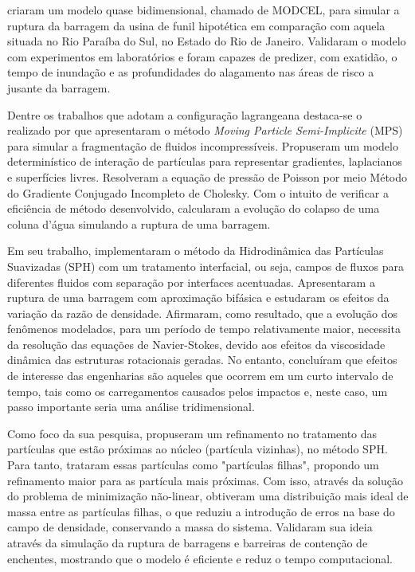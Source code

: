  criaram um modelo quase bidimensional, chamado de MODCEL, para simular a ruptura da barragem da usina de funil hipotética em comparação com aquela situada no Rio Paraíba do Sul, no Estado do Rio de Janeiro. Validaram o modelo com experimentos em laboratórios e foram capazes de predizer, com exatidão, o tempo de inundação e as profundidades do alagamento nas áreas de risco a jusante da barragem.

Dentre os trabalhos que adotam a configuração lagrangeana destaca-se o realizado por  que apresentaram o método \textit{Moving Particle Semi-Implicite} (MPS) para simular a fragmentação de fluidos incompressíveis. Propuseram um modelo determinístico de interação de partículas para representar gradientes, laplacianos e superfícies livres. Resolveram a equação de pressão de Poisson por meio Método do Gradiente Conjugado Incompleto de Cholesky. Com o intuito de verificar a eficiência de método desenvolvido, calcularam a evolução do colapso de uma coluna d'água simulando a ruptura de uma barragem.

Em seu trabalho,  implementaram o método da Hidrodinâmica das Partículas Suavizadas (SPH) com um tratamento interfacial, ou seja, campos de fluxos para diferentes fluidos com separação por interfaces acentuadas. Apresentaram a ruptura de uma barragem com aproximação bifásica e estudaram os efeitos da variação da razão de densidade. Afirmaram, como resultado, que a evolução dos fenômenos modelados, para um período de tempo relativamente maior, necessita da resolução das equações de Navier-Stokes, devido aos efeitos da viscosidade dinâmica das estruturas rotacionais geradas. No entanto, concluíram que efeitos de interesse das engenharias são aqueles que ocorrem em um curto intervalo de tempo, tais como os carregamentos causados pelos impactos e, neste caso, um passo importante seria uma análise tridimensional.

Como foco da sua pesquisa,  propuseram um refinamento no tratamento das partículas que estão próximas ao núcleo (partícula vizinhas), no método SPH. Para tanto, trataram essas partículas como "partículas filhas", propondo um refinamento maior para as partícula mais próximas. Com isso, através da solução do problema de minimização não-linear, obtiveram uma distribuição mais ideal de massa entre as partículas filhas, o que reduziu a introdução de erros na base do campo de densidade, conservando a massa do sistema. Validaram sua ideia através da simulação da ruptura de barragens e barreiras de contenção de enchentes, mostrando que o modelo é eficiente e reduz o tempo computacional.

